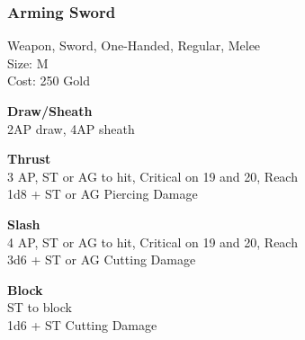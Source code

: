 \subsubsection{Arming Sword}\label{weapon:armingSword}
Weapon, Sword, One-Handed, Regular, Melee\\
Size: M\\
Cost: 250 Gold

\textbf{Draw/Sheath}\\
2AP draw, 4AP sheath

\textbf{Thrust}\\
3 AP, ST or AG to hit, Critical on 19 and 20,  Reach\\
1d8 + \texttimes ST or AG Piercing Damage

\textbf{Slash}\\
4 AP, ST or AG to hit, Critical on 19 and 20,  Reach\\
3d6 + \texttimes ST or AG Cutting Damage

\textbf{Block}\\
ST to block\\
1d6 + \texttimes ST Cutting Damage